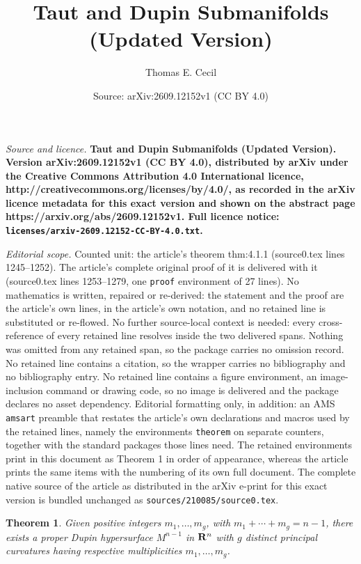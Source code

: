 \documentclass[10pt,a4paper]{amsart}
\title{\bf Taut and Dupin Submanifolds (Updated Version)}
\author{Thomas E. Cecil}
\date{Source: arXiv:2609.12152v1 (CC BY 4.0)}
\newtheorem{theorem}{Theorem}
\begin{document}
\maketitle

\noindent\emph{Source and licence.} \bf Taut and Dupin Submanifolds (Updated Version). Version arXiv:2609.12152v1 (CC BY 4.0), distributed by arXiv under the Creative Commons Attribution 4.0 International licence, http://creativecommons.org/licenses/by/4.0/, as recorded in the arXiv licence metadata for this exact version and shown on the abstract page https://arxiv.org/abs/2609.12152v1. Full licence notice: \texttt{licenses/arxiv-2609.12152-CC-BY-4.0.txt}.\par\smallskip

\noindent\textit{Editorial scope.} Counted unit: the article's theorem thm:4.1.1 (source0.tex lines 1245--1252). The article's complete original proof of it is delivered with it (source0.tex lines 1253--1279, one \texttt{proof} environment of 27 lines). No mathematics is written, repaired or re-derived: the statement and the proof are the article's own lines, in the article's own notation, and no retained line is substituted or re-flowed.  No further source-local context is needed: every cross-reference of every retained line resolves inside the two delivered spans.  Nothing was omitted from any retained span, so the package carries no omission record.  No retained line contains a citation, so the wrapper carries no bibliography and no bibliography entry.  No retained line contains a figure environment, an image-inclusion command or drawing code, so no image is delivered and the package declares no asset dependency.  Editorial formatting only, in addition: an AMS \texttt{amsart} preamble that restates the article's own declarations and macros used by the retained lines, namely the environments \texttt{theorem} on separate counters, together with the standard packages those lines need.  The retained environments print in this document as Theorem 1 in order of appearance, whereas the article prints the same items with the numbering of its own full document.  The complete native source of the article as distributed in the arXiv e-print for this exact version is bundled unchanged as \texttt{sources/210085/source0.tex}.
\begin{theorem}
\label{thm:4.1.1}
Given positive integers $m_1, \ldots , m_g$, with 
$m_1 + \cdots + m_g = n-1$, there exists a proper
Dupin hypersurface $M^{n-1}$ in ${\bf R}^n$ with $g$
distinct principal curvatures having respective
multiplicities $m_1, \ldots , m_g$.
\end{theorem} 
\end{document}
